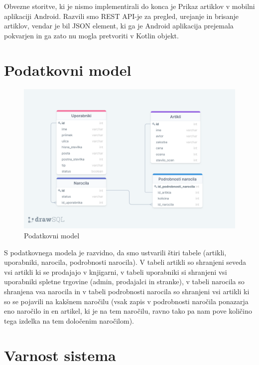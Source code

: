 \documentclass[a4paper,12pt]{report}
\begin{document}
Obvezne storitve, ki je nismo implementirali do konca je Prikaz artiklov v mobilni aplikaciji Android. Razvili smo REST API-je za pregled, urejanje in brisanje artiklov, vendar je bil JSON element, ki ga je Android aplikacija prejemala pokvarjen in ga zato nu mogla pretvoriti v Kotlin objekt. 


\chapter{Podatkovni model}

\begin{figure}[htp]
    \centering
    \includegraphics[width=15cm]{img/sql.png}
    \caption{Podatkovni model}
    \label{fig:galaxy}
\end{figure}

S podatkovnega modela je razvidno, da smo ustvarili štiri tabele (artikli, uporabniki, narocila, podrobnosti narocila). V tabeli artikli so shranjeni seveda vsi artikli ki se prodajajo v knjigarni, v tabeli uporabniki si shranjeni vsi uporabniki spletne trgovine (admin, prodajalci in stranke), v tabeli narocila so shranjena vsa narocila in v tabeli podrobnosti narocila so shranjeni vsi artikli ki so se pojavili na kakšnem naročilu (vsak zapis v podrobnosti naročila ponazarja eno naročilo in en artikel, ki je na tem naročilu, ravno tako pa nam pove količino tega izdelka na tem določenim naročilom).


\chapter{Varnost sistema}
\end{document}
